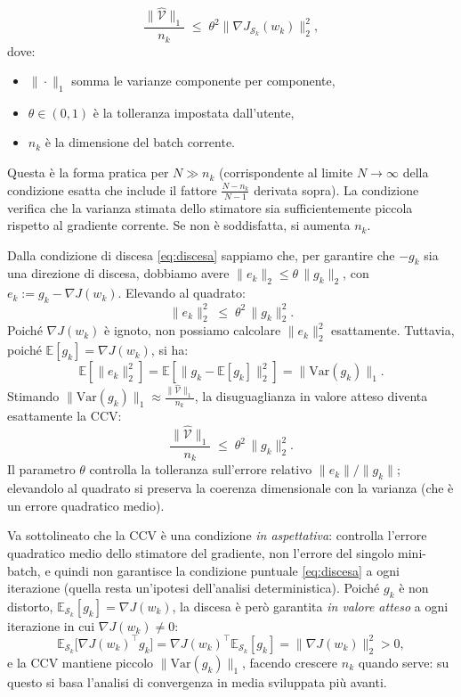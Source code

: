 \documentclass[a4paper,12pt]{article}
\numberwithin{equation}{section}
\numberwithin{figure}{section}
\numberwithin{table}{section}
\begin{document}
\begin{thmbox}
  \[
    \frac{\|\widehat{\mathcal{V}}\|_1}{n_k} \;\leq\; \theta^2 \|\nabla J_{\mathcal{S}_k}(w_k)\|_2^2,
  \]
  dove:
  \begin{itemize}
    \setlength{\itemsep}{0pt}\setlength{\topsep}{2pt}\setlength{\parskip}{0pt}
    \item $\|\cdot\|_1$ somma le varianze componente per componente,
    \item $\theta \in (0,1)$ \`e la tolleranza impostata dall'utente,
    \item $n_k$ \`e la dimensione del batch corrente.
  \end{itemize}
  Questa \`e la forma pratica per $N \gg n_k$ (corrispondente al limite $N\to\infty$ della condizione esatta che include il fattore $\frac{N-n_k}{N-1}$ derivata sopra). La condizione verifica che la varianza stimata dello stimatore sia sufficientemente piccola rispetto al gradiente corrente. Se non \`e soddisfatta, si aumenta $n_k$.
\end{thmbox}
\begin{notebox}

Dalla condizione di discesa \eqref{eq:discesa} sappiamo che, per garantire che $-g_k$ sia una direzione di discesa, dobbiamo avere $\|e_k\|_2 \le \theta\,\|g_k\|_2$, con $e_k := g_k - \nabla J(w_k)$. Elevando al quadrato:
\[
\|e_k\|_2^2 \;\le\; \theta^2\, \|g_k\|_2^2.
\]
Poiché $\nabla J(w_k)$ è ignoto, non possiamo calcolare $\|e_k\|_2^2$ esattamente. Tuttavia, poiché $\mathbb{E}[g_k] = \nabla J(w_k)$, si ha:
\[
\mathbb{E}\left[\|e_k\|_2^2\right] = \mathbb{E}\left[\|g_k - \mathbb{E}[g_k]\|_2^2\right] = \|\mathrm{Var}(g_k)\|_1.
\]
Stimando $\|\mathrm{Var}(g_k)\|_1 \approx \frac{\|\widehat{\mathcal{V}}\|_1}{n_k}$, la disuguaglianza in valore atteso diventa esattamente la CCV:
\[
\frac{\|\widehat{\mathcal{V}}\|_1}{n_k} \;\le\; \theta^2\, \|g_k\|_2^2.
\]
Il parametro $\theta$ controlla la tolleranza sull'errore relativo $\|e_k\|/\|g_k\|$; elevandolo al quadrato si preserva la coerenza dimensionale con la varianza (che è un errore quadratico medio).

Va sottolineato che la CCV è una condizione \emph{in aspettativa}: controlla l'errore quadratico medio dello stimatore del gradiente, non l'errore del singolo mini-batch, e quindi non garantisce la condizione puntuale \eqref{eq:discesa} a ogni iterazione (quella resta un'ipotesi dell'analisi deterministica). Poiché $g_k$ è non distorto, $\mathbb{E}_{\mathcal{S}_k}[g_k]=\nabla J(w_k)$, la discesa è però garantita \emph{in valore atteso} a ogni iterazione in cui $\nabla J(w_k)\neq 0$:
\[
\mathbb{E}_{\mathcal{S}_k}\bigl[\nabla J(w_k)^\top g_k\bigr]
=\nabla J(w_k)^\top\mathbb{E}_{\mathcal{S}_k}[g_k]
=\|\nabla J(w_k)\|_2^2 > 0,
\]
e la CCV mantiene piccolo $\|\mathrm{Var}(g_k)\|_1$, facendo crescere $n_k$ quando serve: su questo si basa l'analisi di convergenza in media sviluppata più avanti.
\end{notebox}
\end{document}
